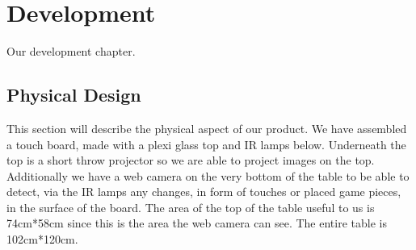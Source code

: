 \chapter{Development}\label{ch:development}
Our development chapter. 

\section{Physical Design} 
This section will describe the physical aspect of our product.
We have assembled a touch board, made with a plexi glass top and IR lamps below. Underneath the top is a short throw projector so we are able to project images on the top. Additionally we have a web camera on the very bottom of the table to be able to detect, via the IR lamps any changes, in form of touches or placed game pieces, in the surface of the board. 
The area of the top of the table useful to us is 74cm*58cm since this is the area the web camera can see. The entire table is 102cm*120cm. 
